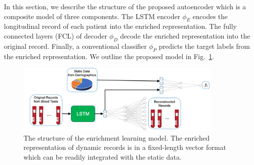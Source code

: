 \fi
In this section, we describe the structure of the proposed autoencoder which is a composite model of three components. The LSTM encoder $\phi_E$ encodes the longitudinal record of each patient into the enriched representation. The fully connected layers (FCL) of decoder $\phi_D$ decode the enriched representation into the original record. Finally, a conventional classifier $\phi_P$ predicts the target labels from the enriched representation. We outline the proposed model in Fig.~\ref{fig: network structure}.
\begin{figure}
    \centering
    \includegraphics[width=0.9\textwidth]{figures/network-structure.png}
    \caption{The structure of the enrichment learning model. The enriched representation of dynamic records is in a fixed-length vector format which can be readily integrated with the static data.
    } \label{fig: network structure}
\end{figure}

